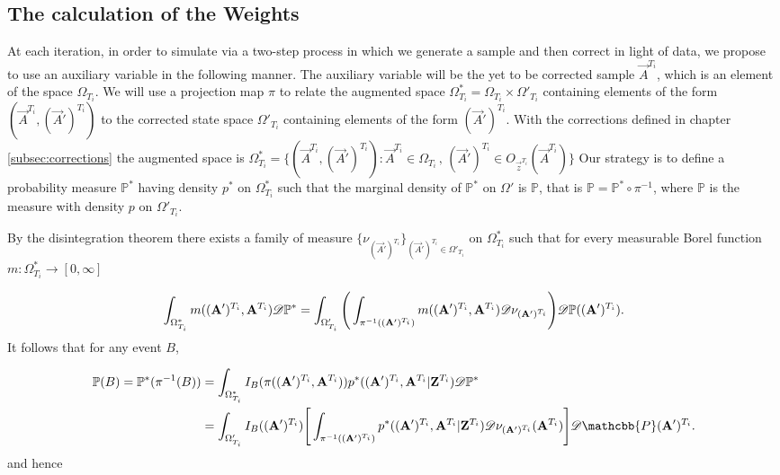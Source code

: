 {\color{red}
\subsection{The calculation of the Weights} \label{subsec:weight}

At each iteration, in order to simulate via a two-step process in which we generate a sample and then correct in light of data, we propose to use an auxiliary variable in the following manner. The auxiliary variable will be the yet to be corrected sample $\vec{A}^{T_i}$, which is an element of the space $\Omega_{T_i}$. We will use a projection map $\pi$ to relate the augmented space $\Omega^*_{T_i} = \Omega_{T_i} \times \Omega'_{T_i}$ containing elements of the form $(\vec{A}^{T_i}, (\vec{A}')^{T_i})$ to the corrected state space $\Omega'_{T_i}$ containing elements of the form  $(\vec{A}')^{T_i}$. With the corrections defined in chapter \ref{subsec:corrections} the augmented space is $\Omega^*_{T_i} = \{ (\vec{A}^{T_i}, (\vec{A}')^{T_i}) : \vec{A}^{T_i} \in \Omega_{T_i} \, , \, (\vec{A}')^{T_i} \in O_{\vec{z}^{T_i}} (\vec{A}^{T_i}) \}$ Our strategy is to define a probability measure $\mathbb{P}^*$ having density $p^*$ on $\Omega^*_{T_i}$ such that the marginal density of $\mathbb{P}^*$ on $\Omega'$ is $\mathbb{P}$, that is $\mathbb{P} = \mathbb{P}^* \circ \pi^{-1}$, where $\mathbb{P}$ is the measure with density $p$ on $\Omega'_{T_i}$.

By the disintegration theorem there exists a family of measure $\{ \nu_{(\vec{A}')^{T_i}}\}_{(\vec{A}')^{T_i} \in \Omega'_{T_i}}$ on $\Omega^*_{T_i}$ such that for every measurable Borel function $ m : \Omega^*_{T_i} \rightarrow [0, \infty]$

\begin{equation*}
    \int_{\Omega^*_{T_i}} m((\mathbf{A}')^{T_i}, \mathbf{A}^{T_i}) \mathscr{D} \mathbb{P}^* = \int_{\Omega'_{T_i}} \Bigg( \int_{\pi^{-1}((\mathbf{A}')^{T_i})} m((\mathbf{A}')^{T_i}, \mathbf{A}^{T_i}) \mathscr{D} \nu_{(\mathbf{A}')^{T_i}}  \Bigg) \mathscr{D} \mathbb{P}((\mathbf{A}')^{T_i}).
\end{equation*}
It follows that for any event $B$,

\begin{align*}
    \mathbb{P}(B) = \mathbb{P}^*(\pi^{-1}(B)) &= \int_{\Omega^*_{T_i}} I_B (\pi((\vec{A}')^{T_i}, \vec{A}^{T_i})) p^* ((\vec{A}')^{T_i}, \vec{A}^{T_i} | \vec{Z}^{T_i}) \D \mathbb{P}^* \\ 
    &= \int_{\Omega'_{T_i}} I_B ((\vec{A}')^{T_i}) \Bigg[ \int_{\pi^{-1}((\vec{A}')^{T_i})} p^* ((\vec{A}')^{T_i}, \vec{A}^{T_i} | \vec{Z}^{T_i}) \D \nu_{(\vec{A}')^{T_i}} (\vec{A}^{T_i}) \Bigg] \D \mathcbb{P} (\vec{A}')^{T_i}.
\end{align*}
and hence

}
